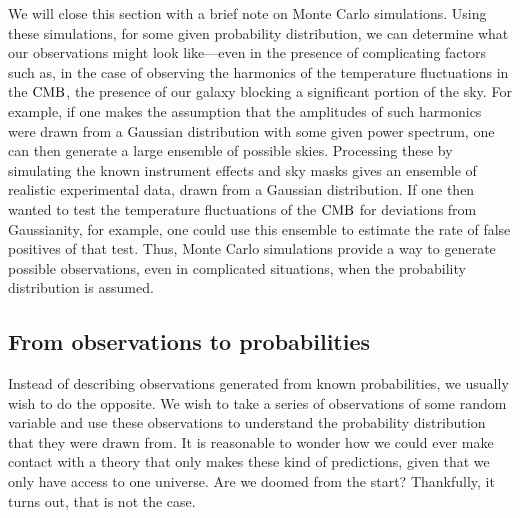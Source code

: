     We will close this section with a brief note on Monte Carlo simulations.
    Using these simulations, for some given probability distribution, we can determine
    what our observations might look like---even in the presence of
    complicating factors such as, in the case of observing the harmonics of the temperature fluctuations
    in the $\text{CMB}$, the presence of our galaxy blocking a significant portion
    of the sky.
    For example, if one makes the assumption that the amplitudes of
    such harmonics were drawn from a Gaussian distribution with some given power spectrum,
    one can then generate a large ensemble of possible skies.
    Processing these by simulating the known instrument effects and
    sky masks gives an ensemble of realistic experimental data, drawn
    from a Gaussian distribution. If one then wanted to test the temperature
    fluctuations of the $\text{CMB}$ for deviations from Gaussianity,
    for example, one could use this ensemble to estimate the rate of false positives
    of that test.
    Thus, Monte Carlo simulations provide a way to generate possible observations,
    even in complicated situations,
    when the probability distribution is assumed.



\subsection{From observations to probabilities}
    Instead of describing observations generated from known probabilities,
    we usually wish to do the opposite.
    We wish to take a series of observations of some random variable and use these observations
    to understand the probability distribution that they were drawn from.
    It is reasonable to wonder how we could ever make contact with a theory
    that only makes these kind of predictions, given that we only have access to one universe.
    Are we doomed from the start? Thankfully, it turns out, that is not the case.


